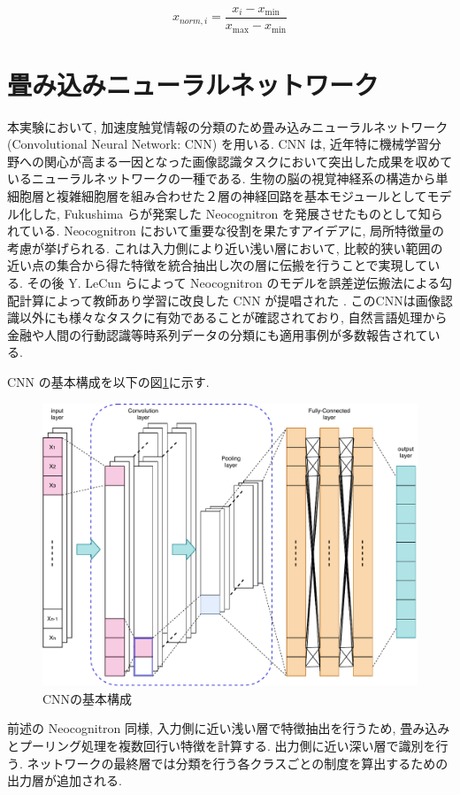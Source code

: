 \begin{equation}
    {x_ {norm,i}=\frac{x_{i}-x_{\min }}{x_{\max }-x_{\min }}}
\end{equation}

\section{畳み込みニューラルネットワーク}
\label{sec:cnn}
本実験において, 加速度触覚情報の分類のため畳み込みニューラルネットワーク (Convolutional Neural Network: CNN) を用いる.  
CNN は, 近年特に機械学習分野への関心が高まる一因となった画像認識タスクにおいて突出した成果を収めているニューラルネットワークの一種である.  
生物の脳の視覚神経系の構造から単細胞層と複雑細胞層を組み合わせた２層の神経回路を基本モジュールとしてモデル化した, Fukushima らが発案した Neocognitron \cite{fukushima1983neocognitron} を発展させたものとして知られている. Neocognitron において重要な役割を果たすアイデアに, 局所特徴量の考慮が挙げられる. これは入力側により近い浅い層において, 比較的狭い範囲の近い点の集合から得た特徴を統合抽出し次の層に伝搬を行うことで実現している. その後 Y. LeCun らによって Neocognitron のモデルを誤差逆伝搬法による勾配計算によって教師あり学習に改良した CNN が提唱された \cite{lecun}. 
このCNNは画像認識以外にも様々なタスクに有効であることが確認されており, 自然言語処理\cite{NLP}から金融\cite{finance}や人間の行動認識\cite{active_recog}\cite{chen2015deep}等時系列データの分類にも適用事例が多数報告されている. 

CNN の基本構成を以下の図\ref{fig:cnn_std}に示す. 
\begin{figure}[H]
    \begin{center}
    \includegraphics[width=12cm]{eps/cnn_architecture.pdf}
    \caption{CNNの基本構成}
    \label{fig:cnn_std}
   \end{center}
   \end{figure}
前述の Neocognitron 同様, 入力側に近い浅い層で特徴抽出を行うため, 畳み込みとプーリング処理を複数回行い特徴を計算する. 出力側に近い深い層で識別を行う. ネットワークの最終層では分類を行う各クラスごとの制度を算出するための出力層が追加される. 

